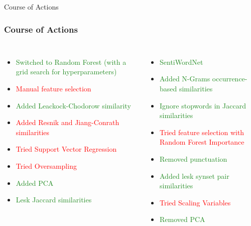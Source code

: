 \documentclass[usenames,dvipsnames]{beamer}
\begin{document}
\begin{frame}{Course of Actions}
    \frametitle{Course of Actions}
    \begin{columns}
        \begin{itemize}
            \item \textcolor{ForestGreen}{Switched to Random Forest (with a grid search for hyperparameters)}
            \pause
            \item \textcolor{red}{Manual feature selection}
            \pause
            \item \textcolor{ForestGreen}{Added Leackock-Chodorow similarity}
            \pause
            \item \textcolor{red}{Added Resnik and Jiang-Conrath similarities}
            \pause
            \item \textcolor{red}{Tried Support Vector Regression}
            \pause
            \item \textcolor{red}{Tried Oversampling}
            \pause
            \item \textcolor{ForestGreen}{Added PCA}
            \item \textcolor{ForestGreen}{Lesk Jaccard similarities}
            \pause
        \end{itemize}   
        \begin{itemize}
            \item \textcolor{ForestGreen}{SentiWordNet}
            \pause
            \item \textcolor{ForestGreen}{Added N-Grams occurrence-based similarities}
            \pause
            \item \textcolor{ForestGreen}{Ignore stopwords in Jaccard similarities}
            \pause
            \item \textcolor{red}{Tried feature selection with Random Forest Importance}
            \pause
            \item \textcolor{ForestGreen}{Removed punctuation}
            \pause
            \item \textcolor{ForestGreen}{Added lesk synset pair similarities}
            \pause
            \item \textcolor{red}{Tried Scaling Variables}
            \pause
            \item \textcolor{ForestGreen}{Removed PCA}
        \end{itemize}
    \end{columns}
\end{frame}
\end{document}
